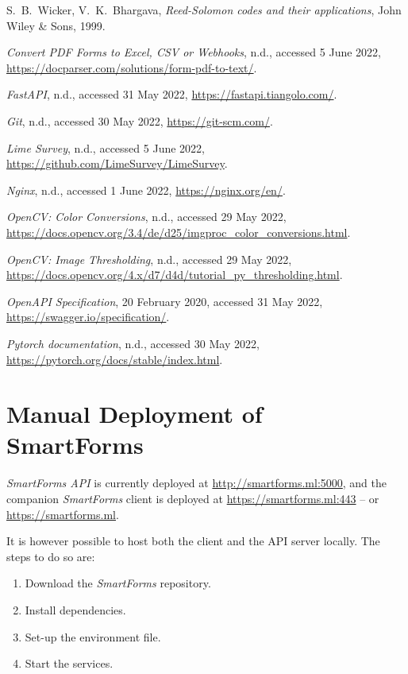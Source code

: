 \documentclass[11pt, a4paper]{report}
\begin{document}
\begin{thebibliography}{99}
S.~B.~Wicker, V.~K.~Bhargava,
\emph{Reed-Solomon codes and their applications},
John Wiley \& Sons, 1999.

\emph{Convert PDF Forms to Excel, CSV or Webhooks}, n.d., accessed 5 June 2022,
\url{https://docparser.com/solutions/form-pdf-to-text/}.

\emph{FastAPI}, n.d., accessed 31 May 2022,
\url{https://fastapi.tiangolo.com/}.

\emph{Git}, n.d., accessed 30 May 2022,
\url{https://git-scm.com/}.

\emph{Lime Survey}, n.d., accessed 5 June 2022,
\url{https://github.com/LimeSurvey/LimeSurvey}.

\emph{Nginx}, n.d., accessed 1 June 2022, 
\url{https://nginx.org/en/}.

\emph{OpenCV: Color Conversions}, n.d., accessed 29 May 2022,  \url{https://docs.opencv.org/3.4/de/d25/imgproc\_color\_conversions.html}.

\emph{OpenCV: Image Thresholding}, n.d., accessed 29 May 2022,
\url{https://docs.opencv.org/4.x/d7/d4d/tutorial\_py\_thresholding.html}.

\emph{OpenAPI Specification}, 20 February 2020, accessed 31 May 2022,
\url{https://swagger.io/specification/}.

\emph{Pytorch documentation}, n.d., accessed 30 May 2022,
\url{https://pytorch.org/docs/stable/index.html}.

\end{thebibliography}


\appendix
\chapter{Manual Deployment of SmartForms}
\label{appendix-links}

\textit{SmartForms API} is currently deployed at \url{http://smartforms.ml:5000}, and the companion \textit{SmartForms} client is deployed at \url{https://smartforms.ml:443} -- or \url{https://smartforms.ml}.

It is however possible to host both the client and the API server locally. The steps to do so are:
\begin{enumerate}
	\item Download the \textit{SmartForms} repository.
	\item Install dependencies.
	\item Set-up the environment file.
	\item Start the services.
\end{enumerate}
\end{document}
